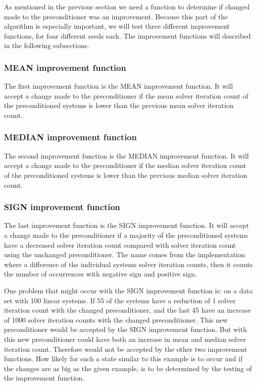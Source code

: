 As mentioned in the previous section we need a function to determine if changed made to the preconditioner was an improvement. Because this part of the algorithm is especially important, we will test three different improvement functions, for four different seeds each. The improvement functions will described in the following subsections.

\subsubsection{MEAN improvement function}
The first improvement function is the MEAN improvement function. It will accept a change made to the preconditioner if the mean solver iteration count of the preconditioned systems is lower than the previous mean solver iteration count.
\subsubsection{MEDIAN improvement function}
The second improvement function is the MEDIAN improvement function. It will accept a change made to the preconditioner if the median solver iteration count of the preconditioned systems is lower than the previous median solver iteration count.
\subsubsection{SIGN improvement function}
The last improvement function is the SIGN improvement function. It will accept a change made to the preconditioner if a majority of the preconditioned systems have a decreased solver iteration count compared with solver iteration count using the unchanged preconditioner. The name comes from the implementation where a difference of the individual systems solver iteration counts, then it counts the number of occurrences with negative sign and positive sign.

One problem that might occur with the SIGN improvement function is: on a data set with 100 linear systems. If 55 of the systems have a reduction of 1 solver iteration count with the changed preconditioner, and the last 45 have an increase of 1000 solver iteration counts with the changed preconditioner. This new preconditioner would be accepted by the SIGN improvement function. But with this new preconditioner could have both an increase in mean and median solver iteration count. Therefore would not be accepted by the other two improvement functions. How likely for such a state similar to this example is to occur and if the changes are as big as the given example, is to be determined by the testing of the improvement function.


